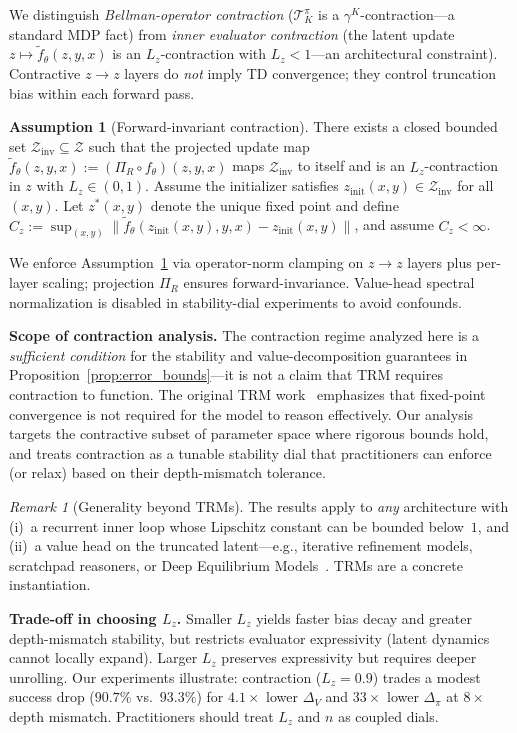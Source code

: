 \documentclass{article}
\theoremstyle{plain}
\theoremstyle{definition}
\newtheorem{assumption}[theorem]{Assumption}
\theoremstyle{remark}
\newtheorem{remark}[theorem]{Remark}
\newcommand{\shortonly}[1]{#1}
\newcommand{\shortonly}[1]{}
\newcommand{\ZZ}{\mathcal{Z}}
\begin{document}
\shortonly{
We distinguish \emph{Bellman-operator contraction} ($\mathcal{T}^\pi_K$ is a $\gamma^K$-contraction---a standard MDP fact) from \emph{inner evaluator contraction} (the latent update $z\mapsto \tilde f_\theta(z,y,x)$ is an $L_z$-contraction with $L_z<1$---an architectural constraint).
Contractive $z\!\to\!z$ layers do \emph{not} imply TD convergence; they control truncation bias within each forward pass.

\begin{assumption}[Forward-invariant contraction]
\label{ass:Lip}
There exists a closed bounded set $\mathcal{Z}_{\mathrm{inv}}\subseteq\ZZ$ such that the projected update map
$\tilde f_\theta(z,y,x):=(\Pi_R\circ f_\theta)(z,y,x)$ maps $\mathcal{Z}_{\mathrm{inv}}$ to itself and is an $L_z$-contraction in $z$ with $L_z\in(0,1)$.
Assume the initializer satisfies $z_{\mathrm{init}}(x,y)\in\mathcal{Z}_{\mathrm{inv}}$ for all $(x,y)$.
Let $z^*(x,y)$ denote the unique fixed point and define
$C_z:=\sup_{(x,y)}\|\tilde f_\theta(z_{\mathrm{init}}(x,y),y,x)-z_{\mathrm{init}}(x,y)\|$,
and assume $C_z<\infty$.
\end{assumption}

We enforce Assumption~\ref{ass:Lip} via operator-norm clamping on $z\!\to\!z$ layers plus per-layer scaling; projection $\Pi_R$ ensures forward-invariance.
Value-head spectral normalization is disabled in stability-dial experiments to avoid confounds.

\textbf{Scope of contraction analysis.}
The contraction regime analyzed here is a \emph{sufficient condition} for the stability and value-decomposition guarantees in Proposition~\ref{prop:error_bounds}---it is not a claim that TRM requires contraction to function.
The original TRM work~\citep{TRM2025} emphasizes that fixed-point convergence is not required for the model to reason effectively.
Our analysis targets the contractive subset of parameter space where rigorous bounds hold, and treats contraction as a tunable stability dial that practitioners can enforce (or relax) based on their depth-mismatch tolerance.

\begin{remark}[Generality beyond TRMs]
\label{rem:generality}
The results apply to \emph{any} architecture with (i)~a recurrent inner loop whose Lipschitz constant can be bounded below~$1$, and (ii)~a value head on the truncated latent---e.g., iterative refinement models, scratchpad reasoners, or Deep Equilibrium Models~\citep{Bai2019DEQ}. TRMs are a concrete instantiation.
\end{remark}

\textbf{Trade-off in choosing $L_z$.}
Smaller $L_z$ yields faster bias decay and greater depth-mismatch stability, but restricts evaluator expressivity (latent dynamics cannot locally expand).
Larger $L_z$ preserves expressivity but requires deeper unrolling.
Our experiments illustrate: contraction ($L_z{=}0.9$) trades a modest success drop ($90.7\%$ vs.\ $93.3\%$) for $4.1\times$ lower $\Delta_V$ and $33\times$ lower $\Delta_\pi$ at $8\times$ depth mismatch.
Practitioners should treat $L_z$ and $n$ as coupled dials.}
\end{document}
